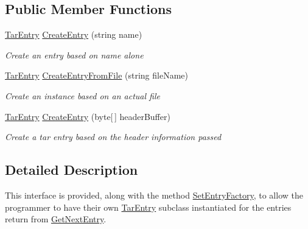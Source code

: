 \subsection*{Public Member Functions}
\begin{DoxyCompactItemize}
\item 
\hyperlink{class_i_c_sharp_code_1_1_sharp_zip_lib_1_1_tar_1_1_tar_entry}{Tar\+Entry} \hyperlink{interface_i_c_sharp_code_1_1_sharp_zip_lib_1_1_tar_1_1_tar_input_stream_1_1_i_entry_factory_a2534ff030c9132b43c76e4ad812558f9}{Create\+Entry} (string name)
\begin{DoxyCompactList}\small\item\em Create an entry based on name alone \end{DoxyCompactList}\item 
\hyperlink{class_i_c_sharp_code_1_1_sharp_zip_lib_1_1_tar_1_1_tar_entry}{Tar\+Entry} \hyperlink{interface_i_c_sharp_code_1_1_sharp_zip_lib_1_1_tar_1_1_tar_input_stream_1_1_i_entry_factory_a65fd272011cf65d0e43b9be928edab73}{Create\+Entry\+From\+File} (string file\+Name)
\begin{DoxyCompactList}\small\item\em Create an instance based on an actual file \end{DoxyCompactList}\item 
\hyperlink{class_i_c_sharp_code_1_1_sharp_zip_lib_1_1_tar_1_1_tar_entry}{Tar\+Entry} \hyperlink{interface_i_c_sharp_code_1_1_sharp_zip_lib_1_1_tar_1_1_tar_input_stream_1_1_i_entry_factory_a689709831847a5c6f896dc3ebc7d0b4f}{Create\+Entry} (byte\mbox{[}$\,$\mbox{]} header\+Buffer)
\begin{DoxyCompactList}\small\item\em Create a tar entry based on the header information passed \end{DoxyCompactList}\end{DoxyCompactItemize}


\subsection{Detailed Description}
This interface is provided, along with the method \hyperlink{class_i_c_sharp_code_1_1_sharp_zip_lib_1_1_tar_1_1_tar_input_stream_a9d78240fd9fa35d7855939ab89c84e47}{Set\+Entry\+Factory}, to allow the programmer to have their own \hyperlink{class_i_c_sharp_code_1_1_sharp_zip_lib_1_1_tar_1_1_tar_entry}{Tar\+Entry} subclass instantiated for the entries return from \hyperlink{class_i_c_sharp_code_1_1_sharp_zip_lib_1_1_tar_1_1_tar_input_stream_ad1c9380146d8de1f637e7a41868b765d}{Get\+Next\+Entry}. 




